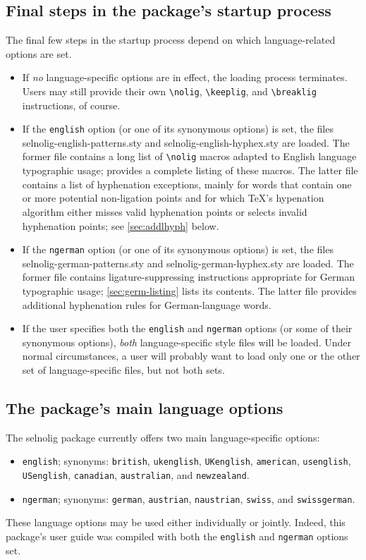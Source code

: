 \documentclass[11pt]{article}
\newcommand{\pkg}[1]{\textsf{#1}}
\newcommand{\opt}[1]{\texttt{#1}}
\newcommand{\cmmd}[1]{\texttt{\textbackslash #1}}
\begin{document}
\subsection{Final steps in the package's startup process}

The final few steps in the startup process depend on which language-related options are set.
\begin{itemize}
\item If \emph{no} language-specific options are in effect, the loading process terminates. Users may still provide their own \cmmd{nolig}, \cmmd{keeplig}, and \cmmd{breaklig} instructions, of course.

\item If the \opt{english} option (or one of its synonymous options) is set, the files \pkg{selnolig-english-patterns.sty} and \pkg{selnolig-english-hyphex.sty} are loaded. The former file contains a long list of \cmmd{nolig} macros adapted to English language typographic usage;  provides a complete listing of these macros. The latter file contains a list of hyphenation exceptions, mainly for words that contain one or more potential non-ligation points and for which \TeX's hypenation algorithm either misses valid hyphenation points or selects invalid hyphenation points; see \cref{sec:addlhyph} below.

\item If the \opt{ngerman} option (or one of its synonymous options) is set, the files \pkg{selnolig-german-patterns.sty} and \pkg{selnolig-german-hyphex.sty} are loaded. The former file contains ligature-suppressing instructions appropriate for German typographic usage; \cref{sec:germ-listing} lists its contents. The latter file provides additional hyphenation rules for German-language words.

\item If the user specifies both the \opt{english} and \opt{ngerman} options (or some of their synonymous options), \emph{both} language-specific style files will be loaded. Under normal circumstances, a user will probably want to load only one or the other set of language-specific files, but not both sets.
\end{itemize}


\subsection{The package's main language options}

The \pkg{selnolig} package currently offers two main language-specific options: 
\begin{itemize}
\item \opt{english}; synonyms: \opt{british}, \opt{ukenglish}, \opt{UKenglish}, \opt{amer\-ican}, \opt{usenglish}, \opt{USenglish}, \opt{cana\-dian}, \opt{australian}, and \opt{new\-zealand}.
\item \opt{ngerman}; synonyms: \opt{german}, \opt{austrian}, \opt{naustrian}, \opt{swiss}, and \opt{swiss\-german}.
\end{itemize}
These language options may be used either individually or jointly. Indeed, this package's user guide was compiled with both the \opt{english} and \opt{ngerman} options set.
\end{document}
